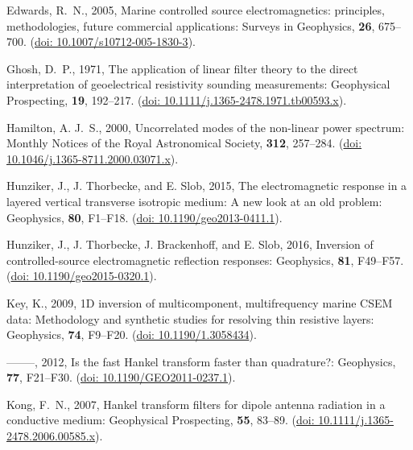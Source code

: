 \documentclass[paper]{geophysics}
\begin{document}
\begin{thebibliography}{}
Edwards, R.~N., 2005, Marine controlled source electromagnetics: principles,
  methodologies, future commercial applications: Surveys in Geophysics, {\bf
  26}, 675--700.
\newblock (\href{http://dx.doi.org/10.1007/s10712-005-1830-3}{doi:
  10.1007/s10712-005-1830-3}).

Ghosh, D.~P., 1971, The application of linear filter theory to the direct
  interpretation of geoelectrical resistivity sounding measurements:
  Geophysical Prospecting, {\bf 19}, 192--217.
\newblock (\href{http://dx.doi.org/10.1111/j.1365-2478.1971.tb00593.x}{doi:
  10.1111/j.1365-2478.1971.tb00593.x}).

Hamilton, A. J.~S., 2000, Uncorrelated modes of the non-linear power spectrum:
  Monthly Notices of the Royal Astronomical Society, {\bf 312}, 257--284.
\newblock (\href{http://dx.doi.org/10.1046/j.1365-8711.2000.03071.x}{doi:
  10.1046/j.1365-8711.2000.03071.x}).

Hunziker, J., J. Thorbecke, and E. Slob, 2015, The electromagnetic response in
  a layered vertical transverse isotropic medium: {A} new look at an old
  problem: Geophysics, {\bf 80}, F1--F18.
\newblock (\href{http://dx.doi.org/10.1190/geo2013-0411.1}{doi:
  10.1190/geo2013-0411.1}).

Hunziker, J., J. Thorbecke, J. Brackenhoff, and E. Slob, 2016, Inversion of
  controlled-source electromagnetic reflection responses: Geophysics, {\bf 81},
  F49--F57.
\newblock (\href{http://dx.doi.org/10.1190/geo2015-0320.1}{doi:
  10.1190/geo2015-0320.1}).

Key, K., 2009, {1D} inversion of multicomponent, multifrequency marine {CSEM}
  data: {M}ethodology and synthetic studies for resolving thin resistive
  layers: Geophysics, {\bf 74}, F9--F20.
\newblock (\href{http://dx.doi.org/10.1190/1.3058434}{doi: 10.1190/1.3058434}).

--------, 2012, Is the fast {H}ankel transform faster than quadrature?:
  Geophysics, {\bf 77}, F21--F30.
\newblock (\href{http://dx.doi.org/10.1190/GEO2011-0237.1}{doi:
  10.1190/GEO2011-0237.1}).

Kong, F.~N., 2007, Hankel transform filters for dipole antenna radiation in a
  conductive medium: Geophysical Prospecting, {\bf 55}, 83--89.
\newblock (\href{http://dx.doi.org/10.1111/j.1365-2478.2006.00585.x}{doi:
  10.1111/j.1365-2478.2006.00585.x}).


\end{thebibliography}
\end{document}

